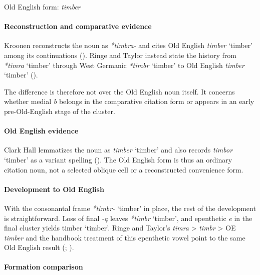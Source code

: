 \documentclass[
  british,
  a4paper,
]{article}
\providecommand{\Recon}[1]{\emph{*#1}}
\begin{document}
Old English form: \emph{timber}

\paragraph{Reconstruction and comparative
evidence}\label{reconstruction-and-comparative-evidence-117}

Kroonen reconstructs the noun as {\emph{*timbra-}} and cites Old English
{\emph{timber}} `timber' among its continuations
(). Ringe and Taylor
instead state the history from \Recon{timra} `timber' through West
Germanic \Recon{timbr} `timber' to Old English {\emph{timber}} `timber'
().

The difference is therefore not over the Old English noun itself. It
concerns whether medial \emph{b} belongs in the comparative citation
form or appears in an early pre-Old-English stage of the cluster.

\paragraph{Old English evidence}\label{old-english-evidence-119}

Clark Hall lemmatizes the noun as {\emph{timber}} `timber' and also
records {\emph{timbor}} `timber' as a variant spelling
(). The Old English
form is thus an ordinary citation noun, not a selected oblique cell or a
reconstructed convenience form.

\paragraph{Development to Old
English}\label{development-to-old-english-117}

With the consonantal frame \Recon{timbr-} `timber' in place, the rest of
the development is straightforward. Loss of final \emph{-ą} leaves
\Recon{tímbr} `timber', and epenthetic \emph{e} in the final cluster
yields {timber} `timber'. Ringe and Taylor's \emph{timra} \textgreater{}
\emph{timbr} \textgreater{} OE \emph{timber} and the handbook treatment
of this epenthetic vowel point to the same Old English result
(;
).

\paragraph{Formation comparison}\label{formation-comparison-5}
\end{document}
